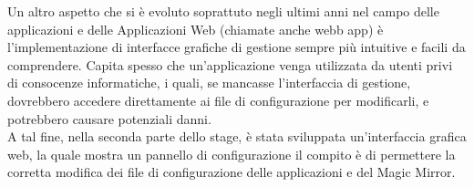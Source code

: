 Un altro aspetto che si \`e evoluto soprattuto negli ultimi anni nel campo
delle applicazioni e delle Applicazioni Web (chiamate anche webb app)
\`e l'implementazione di interfacce grafiche di gestione sempre pi\`u
intuitive e facili da comprendere. Capita spesso che un'applicazione
venga utilizzata da utenti privi di consocenze informatiche, i quali, se mancasse
l'interfaccia di gestione, dovrebbero accedere direttamente ai file di configurazione
per modificarli, e potrebbero causare potenziali danni.\\
A tal fine, nella seconda parte dello stage,
\`e stata sviluppata un'interfaccia grafica web, la quale mostra un pannello di configurazione
il compito \`e di permettere la corretta modifica dei file di configurazione delle applicazioni
e del Magic Mirror.
